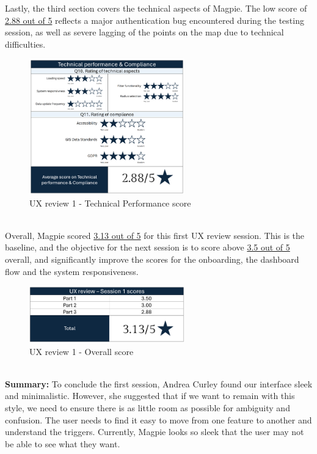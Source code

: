 \newpage
\noindent Lastly, the third section covers the technical aspects of Magpie. The low score of \underline{2.88 out of 5} reflects a major authentication bug encountered during the testing session, as well as severe lagging of the points on the map due to technical difficulties.
\begin{figure}[h!]
    \centering
    \includegraphics[width=0.6\textwidth]{images/ux-survey1-technical.png}
    \caption{UX review 1 - Technical Performance score}
\end{figure}\\
\noindent Overall, Magpie scored \underline{3.13 out of 5} for this first UX review session. This is the baseline, and the objective for the next session is to score above \underline{3.5 out of 5} overall, and significantly improve the scores for the onboarding, the dashboard flow and the system responsiveness.
\begin{figure}[h!]
    \centering
    \includegraphics[width=0.6\textwidth]{images/ux-survey1-summary.png}
    \caption{UX review 1 - Overall score}
\end{figure}\\
\textbf{Summary: }
To conclude the first session, Andrea Curley found our interface sleek and minimalistic. However, she suggested that if we want to remain with this style, we need to ensure there is as little room as possible for ambiguity and confusion. The user needs to find it easy to move from one feature to another and understand the triggers. Currently, Magpie looks so sleek that the user may not be able to see what they want.


